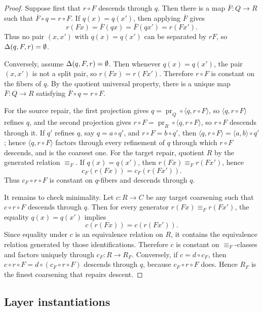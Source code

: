 \begin{proof}
Suppose first that \(r\circ F\) descends through \(q\).  Then there is
a map \(\overline F:Q\to R\) such that
\(\overline F\circ q=r\circ F\).  If \(q(x)=q(x')\), then applying
\(\overline F\) gives
\[
  r(Fx)=\overline F(qx)=\overline F(qx')=r(Fx').
\]
Thus no pair \((x,x')\) with \(q(x)=q(x')\) can be separated by
\(rF\), so \(\Delta(q,F,r)=\emptyset\).

Conversely, assume \(\Delta(q,F,r)=\emptyset\).  Then whenever
\(q(x)=q(x')\), the pair \((x,x')\) is not a split pair, so
\(r(Fx)=r(Fx')\).  Therefore \(r\circ F\) is constant on the fibers
of \(q\).  By the quotient universal property, there is a unique map
\(\overline F:Q\to R\) satisfying
\(\overline F\circ q=r\circ F\).

For the source repair, the first projection gives
\(q=\operatorname{pr}_Q\circ\langle q,r\circ F\rangle\), so
\(\langle q,r\circ F\rangle\) refines \(q\), and the second projection gives
\(r\circ F=\operatorname{pr}_R\circ\langle q,r\circ F\rangle\), so
\(r\circ F\) descends through it. If \(q'\) refines \(q\), say
\(q=a\circ q'\), and \(r\circ F=b\circ q'\), then
\(\langle q,r\circ F\rangle=\langle a,b\rangle\circ q'\); hence
\(\langle q,r\circ F\rangle\) factors through every refinement of \(q\)
through which \(r\circ F\) descends, and is the coarsest one.  For the
target repair, quotient \(R\) by the generated
relation \(\equiv_F\).  If \(q(x)=q(x')\), then
\(r(Fx)\equiv_F r(Fx')\), hence
\[
  c_F(r(Fx))=c_F(r(Fx')).
\]
Thus \(c_F\circ r\circ F\) is constant on \(q\)-fibers and descends
through \(q\).

It remains to check minimality.  Let \(c:R\to C\) be any target
coarsening such that \(c\circ r\circ F\) descends through \(q\).  Then
for every generator \(r(Fx)\equiv_F r(Fx')\), the equality
\(q(x)=q(x')\) implies
\[
  c(r(Fx))=c(r(Fx')).
\]
Since equality under \(c\) is an equivalence relation on \(R\), it
contains the equivalence relation generated by those identifications.
Therefore \(c\) is constant on \(\equiv_F\)-classes and factors
uniquely through \(c_F:R\to R_F\).  Conversely, if \(c=d\circ c_F\), then
\(c\circ r\circ F=d\circ(c_F\circ r\circ F)\) descends through \(q\),
because \(c_F\circ r\circ F\) does.  Hence \(R_F\) is the finest
coarsening that repairs descent.
\end{proof}

\subsection*{Layer instantiations}\label{layer-inst:F2}


